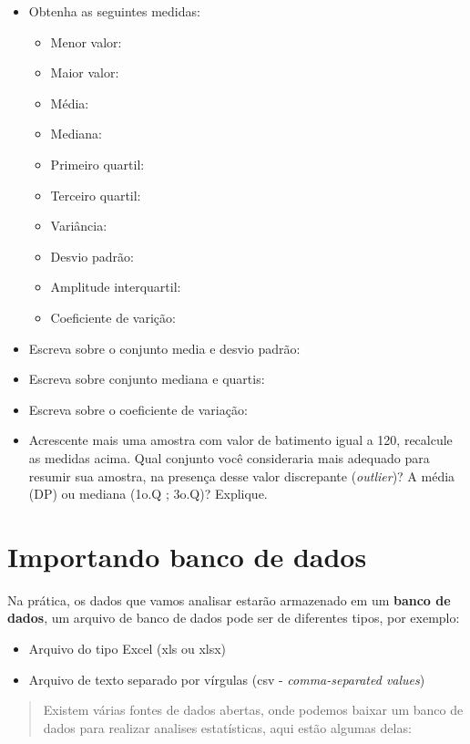 \documentclass[
]{book}
\providecommand{\tightlist}{%
  \setlength{\itemsep}{0pt}\setlength{\parskip}{0pt}}
\begin{document}
\begin{itemize}
\item
  Obtenha as seguintes medidas:

  \begin{itemize}
  \tightlist
  \item
    Menor valor:
  \item
    Maior valor:
  \item
    Média:
  \item
    Mediana:
  \item
    Primeiro quartil:
  \item
    Terceiro quartil:
  \item
    Variância:
  \item
    Desvio padrão:
  \item
    Amplitude interquartil:
  \item
    Coeficiente de varição:
  \end{itemize}
\item
  Escreva sobre o conjunto media e desvio padrão:
\item
  Escreva sobre conjunto mediana e quartis:
\item
  Escreva sobre o coeficiente de variação:
\item
  Acrescente mais uma amostra com valor de batimento igual a 120, recalcule as medidas acima. Qual conjunto você consideraria mais adequado para resumir sua amostra, na presença desse valor discrepante (\emph{outlier})? A média (DP) ou mediana (1o.Q ; 3o.Q)? Explique.
\end{itemize}

\hypertarget{importando-banco-de-dados}{%
\chapter{Importando banco de dados}\label{importando-banco-de-dados}}

Na prática, os dados que vamos analisar estarão armazenado em um \textbf{banco de dados}, um arquivo de banco de dados pode ser de diferentes tipos, por exemplo:

\begin{itemize}
\item
  Arquivo do tipo Excel (xls ou xlsx)
\item
  Arquivo de texto separado por vírgulas (csv - \emph{comma-separated values})
\end{itemize}

\begin{quote}
Existem várias fontes de dados abertas, onde podemos baixar um banco de dados para realizar analises estatísticas, aqui estão algumas delas:
\end{quote}
\end{document}
